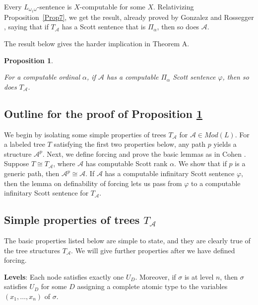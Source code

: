 \documentclass{article}
\newtheorem{prop}[thm]{Proposition}
\begin{document}
Every $L_{\omega_1\omega}$-sentence is $X$-computable for some $X$.  Relativizing Proposition~\ref{Prop7}, we get the result, already proved by Gonzalez and Rossegger \cite{GR}, saying that if $T_\mathcal{A}$ has a Scott sentence that is $\Pi_{\alpha}$,  then so does $\mathcal{A}$. 

\bigskip

The result below gives the harder implication in Theorem A. 

\begin{prop}\label{prop:PushForwardCompSentences}

  For a computable ordinal $\alpha$, if $\mathcal{A}$ has a computable $\Pi_\alpha$ Scott sentence $\varphi$, then so does $T_\mathcal{A}$.  

\end{prop} 

\subsection{Outline for the proof of Proposition \ref{prop:PushForwardCompSentences}}  

We begin by isolating some simple properties of trees $T_\mathcal{A}$ for $\mathcal{A}\in Mod(L)$.  For a labeled tree $T$ satisfying the first two properties below, any path $p$ yields a structure $\mathcal{A}^p$.  Next, we define forcing and prove the basic lemmas as in Cohen \cite{Cohen}.  Suppose $T\cong T_\mathcal{A}$, where $\mathcal{A}$ has computable Scott rank $\alpha$.  We show that if $p$ is a generic path, then $\mathcal{A}^p\cong\mathcal{A}$.  If $\mathcal{A}$ has a computable infinitary Scott sentence $\varphi$, then the lemma on definability of forcing lets us pass from $\varphi$ to a computable infinitary Scott sentence for $T_\mathcal{A}$.  

\subsection{Simple properties of trees $T_\mathcal{A}$}

The basic properties listed below are simple to state, and they are clearly true of the tree structures $T_\mathcal{A}$.  We will give further properties after we have defined forcing.  

\bigskip
\noindent
\textbf{Levels}:  Each node satisfies exactly one $U_D$.  Moreover, if $\sigma$ is at level $n$, then $\sigma$ satisfies $U_D$ for some $D$ assigning a complete atomic type to the variables  $(x_1,\ldots,x_n)$ of $\sigma$.   
\end{document}
